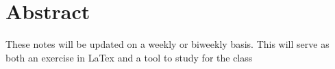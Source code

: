 \chapter{Abstract}
These notes will be updated on a weekly or biweekly basis. This will serve as both an exercise in LaTex and a tool to study for the class
